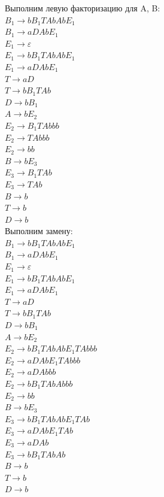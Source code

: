 \documentclass[a4paper,14pt]{extarticle}
\begin{document}
\begin{enumerate}[1.]
Выполним левую факторизацию для A, B:\\
$B_1 \rightarrow bB_1TAbAbE_1$\\
$B_1 \rightarrow aDAbE_1$\\
$E_1 \rightarrow \varepsilon$\\
$E_1 \rightarrow bB_1TAbAbE_1$\\
$E_1 \rightarrow aDAbE_1$\\
$T \rightarrow aD$\\ 
$T \rightarrow bB_1TAb$\\
$D \rightarrow bB_1$\\
$A \rightarrow bE_2$\\
$E_2 \rightarrow B_1TAbbb$\\
$E_2 \rightarrow TAbbb$\\
$E_2 \rightarrow bb$\\
$B \rightarrow bE_3$\\ 
$E_3 \rightarrow B_1TAb$\\ 
$E_3 \rightarrow TAb$\\
$B \rightarrow b$\\
$T \rightarrow b$\\
$D \rightarrow b$\\

Выполним замену:\\
$B_1 \rightarrow bB_1TAbAbE_1$\\
$B_1 \rightarrow aDAbE_1$\\
$E_1 \rightarrow \varepsilon$\\
$E_1 \rightarrow bB_1TAbAbE_1$\\
$E_1 \rightarrow aDAbE_1$\\
$T \rightarrow aD$\\ 
$T \rightarrow bB_1TAb$\\
$D \rightarrow bB_1$\\
$A \rightarrow bE_2$\\
$E_2 \rightarrow bB_1TAbAbE_1TAbbb$\\
$E_2 \rightarrow aDAbE_1TAbbb$\\
$E_2 \rightarrow aDAbbb$\\
$E_2 \rightarrow bB_1TAbAbbb$\\
$E_2 \rightarrow bb$\\
$B \rightarrow bE_3$\\ 
$E_3 \rightarrow bB_1TAbAbE_1TAb$\\ 
$E_3 \rightarrow aDAbE_1TAb$\\ 
$E_3 \rightarrow aDAb$\\
$E_3 \rightarrow bB_1TAbAb$\\
$B \rightarrow b$\\
$T \rightarrow b$\\
$D \rightarrow b$\\


\end{enumerate}
\end{document}
